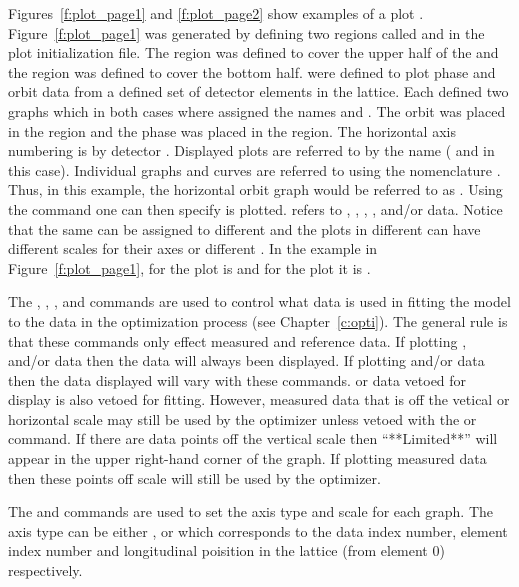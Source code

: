 Figures~\ref{f:plot_page1} and \ref{f:plot_page2} show examples of a
plot . Figure~\ref{f:plot_page1} was generated by defining
two regions called  and  in the plot initialization
file. The  region was defined to cover the upper half of the
 and the  region was defined to cover the bottom
half.  were defined to plot phase and orbit data
from a defined set of detector elements in the lattice. Each
 defined two graphs which in both cases where
assigned the names  and . The orbit  was
placed in the  region and the phase  was
placed in the  region. The horizontal axis numbering is by
detector .  Displayed plots are referred to by the
 name ( and  in this case). Individual
graphs and curves are referred to using the nomenclature
. Thus, in this example, the horizontal orbit graph
would be referred to as .  Using the  command one
can then specify  is plotted.  refers to
, , , , and/or
 data.  Notice that the same  can be
assigned to different  and the plots in different
 can have different scales for their axes or different
. In the example in Figure~\ref{f:plot_page1},  for
the  plot is  and for the  plot it is
.

The , , , and  commands are used
to control what data is used in fitting the model to the data in the
optimization process (see Chapter~\ref{c:opti}). The general rule is
that these commands only effect measured and reference data. If
plotting ,  and/or  data then the data
will always been displayed. If plotting  and/or  data
then the data displayed will vary with these commands.   or
 data vetoed for display is also vetoed for fitting.  However,
measured data that is off the vetical or horizontal scale may still be
used by the optimizer unless vetoed with the  or 
command.  If there are data points off the vertical scale then
``**Limited**'' will appear in the upper right-hand corner of the
graph. If plotting measured data then these points off scale will
still be used by the optimizer.

The  and  commands are used to set the axis
type and scale for each graph. The axis type can be either ,
 or  which corresponds to the data index number,
element index number and longitudinal poisition in the lattice (from
element 0) respectively.

